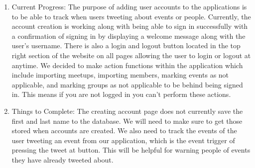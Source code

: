 \documentclass[letterpaper,10pt,onecolumn]{IEEEtran} %
\begin{document}
\begin{enumerate}[label*=\arabic*.]
  \item Current Progress: The purpose of adding user accounts to the applications
    is to be able to track when users tweeting about events or people. Currently,
    the account creation is working along with being able to sign in successfully
    with a confirmation of signing in by displaying a welcome message along with
    the user's username. There is also a login and logout button located in the
    top right section of the website on all pages allowing the user to login or
    logout at anytime. We decided to make action functions within the application
    which include importing meetups, importing members, marking events as not
    applicable, and marking groups as not applicable to be behind being signed in.
    This means if you are not logged in you can't perform these actions.
 

  \item Things to Complete: The creating account page does not currently save
    the first and last name to the database. We will need to make sure to get
    those stored when accounts are created. We also need to track the events of
    the user tweeting an event from our application, which is the event trigger
    of pressing the tweet at button. This will be helpful for warning people of
    events they have already tweeted about.


\end{enumerate}
\end{document}
